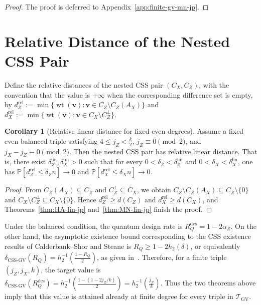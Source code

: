 \documentclass[11pt]{article}
\theoremstyle{definition}
\newtheorem{corollary}[theorem]{Corollary}
\newcommand{\PP}{\mathbb P}
\newcommand{\wt}{\operatorname{wt}}
\newcommand{\bv}{\mathbf v}
\newcommand{\h}{h_2}
\newcommand{\CZ}{C_Z}
\newcommand{\CX}{C_X}
\begin{document}
\begin{proof}
The proof is deferred to Appendix~\ref{app:finite-gv-mn-jp}.
\end{proof}

\section{Relative Distance of the Nested CSS Pair}

Define the relative distances of the nested CSS pair \((\CX,\CZ)\), with the convention that the value is \(+\infty\) when the corresponding difference set is empty, by \(d_Z^{\mathrm{rel}}:=\min\{\wt(\bv): \bv\in \CZ\setminus C_Z(A_X)\}\) and \(d_X^{\mathrm{rel}}:=\min\{\wt(\bv): \bv\in \CX\setminus \CZ^\perp\}\).
 
\begin{corollary}[Relative linear distance for fixed even degrees]\label{cor:lin-jp}
Assume a fixed even balanced triple satisfying \(4\le j_Z<\frac{k}{2}\), \(j_Z\equiv 0\pmod 2\), and \(j_X-j_Z\equiv 0\pmod 2\). Then the nested CSS pair has relative linear distance. That is, there exist \(\delta_Z^{\mathrm{lin}},\delta_X^{\mathrm{lin}}>0\) such that for every \(0<\delta_Z<\delta_Z^{\mathrm{lin}}\) and \(0<\delta_X<\delta_X^{\mathrm{lin}}\), one has \(\PP[d_Z^{\mathrm{rel}}\le \delta_Z n]\to 0\) and \(\PP[d_X^{\mathrm{rel}}\le \delta_X n]\to 0\).
\end{corollary}

\begin{proof}
From \(C_Z(A_X)\subseteq \CZ\) and \(\CZ^\perp\subseteq \CX\), we obtain \(\CZ\setminus C_Z(A_X)\subseteq \CZ\setminus\{0\}\) and \(\CX\setminus \CZ^\perp\subseteq \CX\setminus\{0\}\). Hence \(d_Z^{\mathrm{rel}}\ge d(\CZ)\) and \(d_X^{\mathrm{rel}}\ge d(\CX)\), and Theorems~\ref{thm:HA-lin-jp} and~\ref{thm:MN-lin-jp} finish the proof.
\end{proof}

Under the balanced condition, the quantum design rate is \(R_Q^{\mathrm{des}}=1-2\alpha_Z\).
On the other hand, the asymptotic existence bound corresponding to
the CSS existence results of Calderbank--Shor and Steane is
 \(R_Q \ge 1-2\h(\delta)\), or equivalently \(\delta_{\mathrm{CSS\text{-}GV}}(R_Q)=\h^{-1}\!\left(\frac{1-R_Q}{2}\right)\), as given in~\cite{CS96,Ste96}.
Therefore, for a finite triple \((j_Z,j_X,k)\), the target value is \(\delta_{\mathrm{CSS\text{-}GV}}(R_Q^{\mathrm{des}})=\h^{-1}\!\left(\frac{1-(1-2j_Z/k)}{2}\right)=\h^{-1}\!\left(\frac{j_Z}{k}\right)\).
Thus the two theorems above imply that this value is attained already at finite degree for every triple in \(\mathcal T_{\mathrm{GV}}\).
\end{document}
